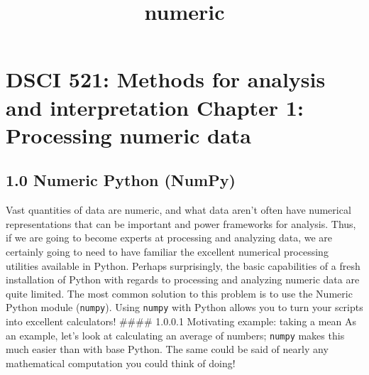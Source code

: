 \documentclass[11pt]{article}
\title{numeric}
\begin{document}
    
    
    \maketitle
    
    

    
    \hypertarget{dsci-521-methods-for-analysis-and-interpretation-chapter-1-processing-numeric-data}{%
\section{\texorpdfstring{DSCI 521: Methods for analysis and
interpretation Chapter 1: Processing numeric
data}{DSCI 521: Methods for analysis and interpretation   Chapter 1: Processing numeric data}}\label{dsci-521-methods-for-analysis-and-interpretation-chapter-1-processing-numeric-data}}

\hypertarget{numeric-python-numpy}{%
\subsection{1.0 Numeric Python (NumPy)}\label{numeric-python-numpy}}

Vast quantities of data are numeric, and what data aren't often have
numerical representations that can be important and power frameworks for
analysis. Thus, if we are going to become experts at processing and
analyzing data, we are certainly going to need to have familiar the
excellent numerical processing utilities available in Python. Perhaps
surprisingly, the basic capabilities of a fresh installation of Python
with regards to processing and analyzing numeric data are quite limited.
The most common solution to this problem is to use the Numeric Python
module (\texttt{numpy}). Using \texttt{numpy} with Python allows you to
turn your scripts into excellent calculators! \#\#\#\# 1.0.0.1
Motivating example: taking a mean As an example, let's look at
calculating an average of numbers; \texttt{numpy} makes this much easier
than with base Python. The same could be said of nearly any mathematical
computation you could think of doing!
\end{document}
